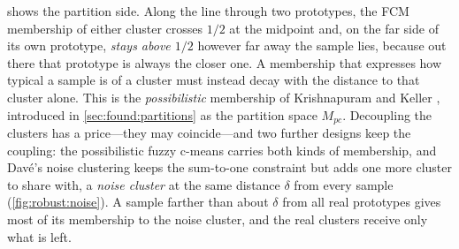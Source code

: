  shows the partition side. Along the line through two prototypes, the FCM membership of either cluster crosses $1/2$ at the midpoint and, on the far side of its own prototype, \emph{stays above $1/2$} however far away the sample lies, because out there that prototype is always the closer one. A membership that expresses how typical a sample is of a cluster must instead decay with the distance to that cluster alone. This is the \emph{possibilistic} membership of Krishnapuram and Keller \cite{krishnapuram:1993:pcm}, introduced in \cref{sec:found:partitions} as the partition space $M_{pc}$. Decoupling the clusters has a price---they may coincide---and two further designs keep the coupling: the possibilistic fuzzy c-means \cite{pal:2005:pfcm} carries both kinds of membership, and Davé's noise clustering \cite{dave:1991:noise} keeps the sum-to-one constraint but adds one more cluster to share with, a \emph{noise cluster} at the same distance $\delta$ from every sample (\cref{fig:robust:noise}). A sample farther than about $\delta$ from all real prototypes gives most of its membership to the noise cluster, and the real clusters receive only what is left.

